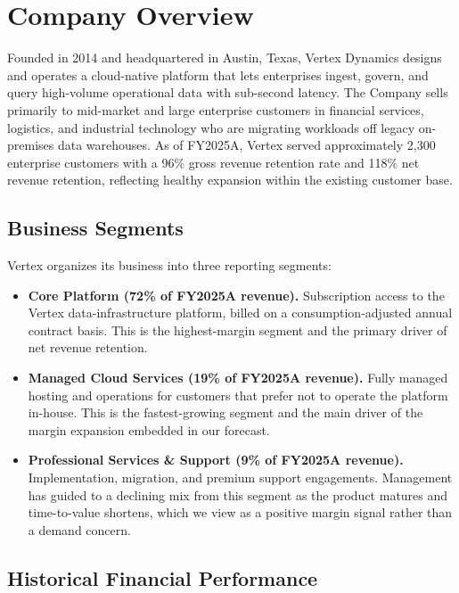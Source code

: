 \section{Company Overview}

Founded in 2014 and headquartered in Austin, Texas, Vertex Dynamics designs and operates a cloud-native platform that lets enterprises ingest, govern, and query high-volume operational data with sub-second latency. The Company sells primarily to mid-market and large enterprise customers in financial services, logistics, and industrial technology who are migrating workloads off legacy on-premises data warehouses. As of FY2025A, Vertex served approximately 2,300 enterprise customers with a 96\% gross revenue retention rate and 118\% net revenue retention, reflecting healthy expansion within the existing customer base.

\subsection{Business Segments}

Vertex organizes its business into three reporting segments:

\begin{itemize}[leftmargin=1.3em,itemsep=2pt,topsep=2pt]
\item \textbf{Core Platform (72\% of FY2025A revenue).} Subscription access to the Vertex data-infrastructure platform, billed on a consumption-adjusted annual contract basis. This is the highest-margin segment and the primary driver of net revenue retention.
\item \textbf{Managed Cloud Services (19\% of FY2025A revenue).} Fully managed hosting and operations for customers that prefer not to operate the platform in-house. This is the fastest-growing segment and the main driver of the margin expansion embedded in our forecast.
\item \textbf{Professional Services \& Support (9\% of FY2025A revenue).} Implementation, migration, and premium support engagements. Management has guided to a declining mix from this segment as the product matures and time-to-value shortens, which we view as a positive margin signal rather than a demand concern.
\end{itemize}

\subsection{Historical Financial Performance}

